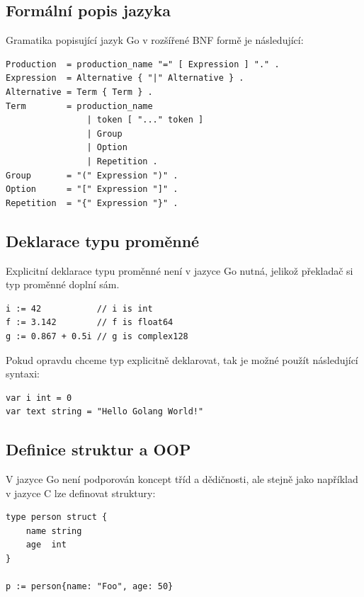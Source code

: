 \documentclass[12pt, a4paper]{article}
\begin{document}
\subsection{Formální popis jazyka}
Gramatika popisující jazyk Go v rozšířené BNF formě je následující:

\begin{lstlisting}
Production  = production_name "=" [ Expression ] "." .
Expression  = Alternative { "|" Alternative } .
Alternative = Term { Term } .
Term        = production_name 
                | token [ "..." token ] 
                | Group 
                | Option 
                | Repetition .
Group       = "(" Expression ")" .
Option      = "[" Expression "]" .
Repetition  = "{" Expression "}" .

\end{lstlisting}

\subsection{Deklarace typu proměnné}
Explicitní deklarace typu proměnné není v jazyce Go nutná, jelikož překladač si typ proměnné doplní sám.


\begin{lstlisting}[caption={Typ proměnné nemusí být v kódu explicitně deklarován}]
i := 42           // i is int
f := 3.142        // f is float64
g := 0.867 + 0.5i // g is complex128
\end{lstlisting}

Pokud opravdu chceme typ explicitně deklarovat, tak je možné použít následující syntaxi:

\begin{lstlisting}[caption={Explicitní deklarace typu proměnné}, captionpos=b]
var i int = 0
var text string = "Hello Golang World!"
\end{lstlisting}


\subsection{Definice struktur a OOP}
V jazyce Go není podporován koncept tříd a dědičnosti, ale stejně jako například v jazyce C lze definovat struktury:

\begin{lstlisting}[caption={"Definice struktur"}, captionpos=b]
type person struct {
    name string
    age  int
}

p := person{name: "Foo", age: 50}
\end{lstlisting}
\end{document}
